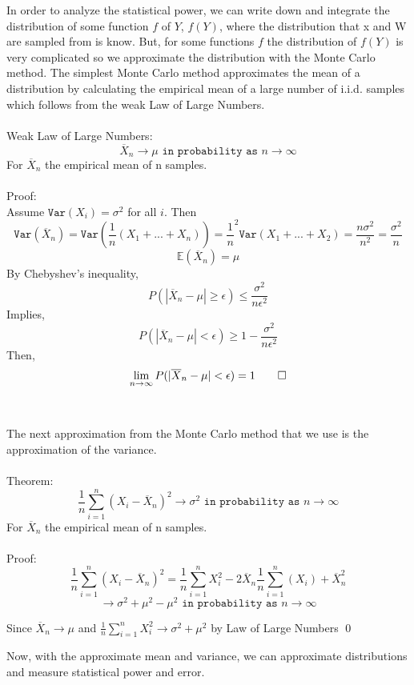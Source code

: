 \documentclass{article}
\begin{document}
In order to analyze the statistical power, we can write down and integrate the distribution of some function $f$ of $Y$, $f(Y)$, where the distribution that x and W are sampled from is know. But, for some functions $f$ the distribution of $f(Y)$ is very complicated so we approximate the distribution with the Monte Carlo method. The simplest Monte Carlo method approximates the mean of a distribution by calculating the empirical mean of a large number of i.i.d. samples which follows from the weak Law of Large Numbers.\\
\\
Weak Law of Large Numbers:
$$\overline X_n \rightarrow \mu \texttt{ in probability as } n \rightarrow \infty $$
For $\overline X_n$ the empirical mean of n samples.\\
\\
Proof:\\
Assume $\texttt{Var}(X_i) = \sigma^2$ for all $i$. Then
$$\texttt{Var}(\overline X_n) = \texttt{Var}(\frac 1n (X_1+...+X_n)) = \frac 1n^2 \texttt{Var}(X_1+...+X_2) = \frac{n \sigma^2}{n^2} = \frac{\sigma^2}{n} $$
$$\mathbb{E}(\overline X_n)=\mu$$
By Chebyshev's inequality,
$$P(|\overline X_n-\mu|\ge \epsilon) \le \frac{\sigma^2}{n \epsilon^2}$$
Implies,
$$P(|\overline X_n-\mu | < \epsilon) \ge 1-\frac{\sigma^2}{n \epsilon^2}$$
Then,
$$\lim_{n \rightarrow \infty} P(|\overline X_n-\mu| < \epsilon) = 1 \qed $$
\\
\\
The next approximation from the Monte Carlo method that we use is the approximation of the variance.\\
\\
Theorem:
$$\frac 1n \sum_{i=1}^n (X_i - \overline X_n)^2 \rightarrow \sigma^2 \texttt{ in probability as } n \rightarrow \infty $$
For $\overline X_n$ the empirical mean of n samples.\\
\\
Proof:\\
$$ \frac 1n \sum_{i=1}^n (X_i - \overline X_n)^2 
     = \frac 1n \sum_{i=1}^n X_i^2 - 2 \overline X_n \frac 1n \sum_{i=1}^n (X_i) + \overline X_n^2$$
$$ \rightarrow \sigma^2 + \mu^2 - \mu^2 \texttt{ in probability as } n \rightarrow \infty $$

Since $ \overline X_n \rightarrow \mu $ and $ \frac 1n \sum_{i=1}^n X_i^2 \rightarrow \sigma^2 + \mu^2 $ by Law of Large Numbers \qed

Now, with the approximate mean and variance, we can approximate distributions and measure statistical power and error.
\end{document}
